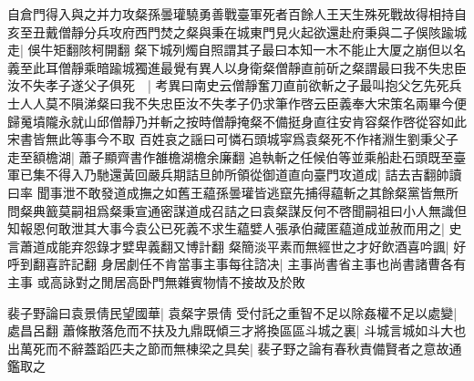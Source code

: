 自倉門得入與之并力攻粲孫曇瓘驍勇善戰臺軍死者百餘人王天生殊死戰故得相持自亥至丑戴僧靜分兵攻府西門焚之粲與秉在城東門見火起欲還赴府秉與二子俁陔踰城走|{
	俁牛矩翻陔柯開翻}
粲下城列燭自照謂其子最曰本知一木不能止大厦之崩但以名義至此耳僧靜乘暗踰城獨進最覺有異人以身衛粲僧靜直前斫之粲謂最曰我不失忠臣汝不失孝子遂父子俱死　|{
	考異曰南史云僧靜奮刀直前欲斬之子最叫抱父乞先死兵士人人莫不隕涕粲曰我不失忠臣汝不失孝子仍求筆作啓云臣義奉大宋策名兩畢今便歸䰟墳隴永就山邱僧靜乃并斬之按時僧靜掩粲不備挺身直往安肯容粲作啓從容如此宋書皆無此等事今不取}
百姓哀之謡曰可憐石頭城寜爲袁粲死不作禇淵生劉秉父子走至額檐湖|{
	蕭子顯齊書作雒檐湖檐余廉翻}
追執斬之任候伯等並乘船赴石頭既至臺軍已集不得入乃馳還黃回嚴兵期詰旦帥所領從御道直向臺門攻道成|{
	詰去吉翻帥讀曰率}
聞事泄不敢發道成撫之如舊王藴孫曇瓘皆逃竄先捕得藴斬之其餘粲黨皆無所問粲典籖莫嗣祖爲粲秉宣通密謀道成召詰之曰袁粲謀反何不啓聞嗣祖曰小人無識但知報恩何敢泄其大事今袁公已死義不求生藴嬖人張承伯藏匿藴道成並赦而用之|{
	史言蕭道成能弃怨錄才嬖卑義翻又博計翻}
粲簡淡平素而無經世之才好飲酒喜吟諷|{
	好呼到翻喜許記翻}
身居劇任不肯當事主事每往諮决|{
	主事尚書省主事也尚書諸曹各有主事}
或高詠對之閒居高卧門無雜賓物情不接故及於敗

裴子野論曰袁景倩民望國華|{
	袁粲字景倩}
受付託之重智不足以除姦權不足以處變|{
	處昌呂翻}
蕭條散落危而不扶及九鼎既傾三才將換區區斗城之裏|{
	斗城言城如斗大也}
出萬死而不辭蓋蹈匹夫之節而無棟梁之具矣|{
	裴子野之論有春秋責備賢者之意故通鑑取之}


